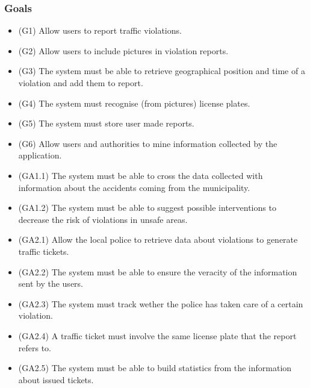 \subsubsection{Goals}
\begin{itemize}
	\item (G1) 	Allow users to report traffic violations. \newline	
	\item (G2)	Allow users to include pictures in violation reports. \newline
	\item (G3)	The system must be able to retrieve geographical position and time of a violation and add them to report.\newline
	\item (G4)	The system must recognise (from pictures) license plates.\newline
	\item (G5) 	The system must store user made reports.\newline
	\item (G6)	Allow users and authorities to mine information collected by the application. \newline
	\item (GA1.1)	The system must be able to cross the data collected with information about the accidents coming from the municipality. \newline
	\item (GA1.2)	The system must be able to suggest possible interventions to decrease the risk of violations in unsafe areas. \newline
	\item (GA2.1)	Allow the local police to retrieve data about violations to generate traffic tickets. \newline
	\item (GA2.2)	The system must be able to ensure the veracity of the information sent by the users. \newline
	\item (GA2.3)	The system must track wether the police has taken care of a certain violation. \newline
	\item (GA2.4)	A traffic ticket must involve the same license plate that the report refers to. \newline
	\item (GA2.5)	The system must be able to build statistics from the information about issued tickets. 
\end{itemize}


